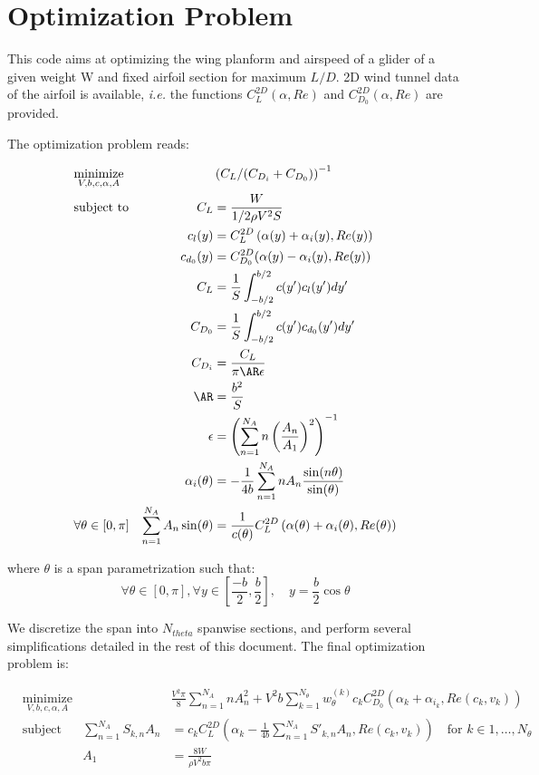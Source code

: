 \documentclass[letterpaper,12pt]{article}
\begin{document}
\section{Optimization Problem}

This code aims at optimizing the wing planform and airspeed of a glider of a given weight W and fixed airfoil section for maximum $L/D$.
2D wind tunnel data of the airfoil is available, {\it i.e.} the functions
$C_L^{2D}(\alpha, Re)$ and 
$C_{D_0}^{2D}(\alpha, Re)$ are provided.

The optimization problem reads:

\begin{align*}
	& \underset{V, b, c, \alpha, A}{\text{minimize}}
	& & \left( C_L / (C_{D_i} + C_{D_0})\right)^{-1} \nonumber \\
	& \text{subject to} 
	& C_L &= \frac{W}{1/2 \rho V^2 S} \\
	& & c_l(y) &= C_L^{2D} \left( \alpha(y) + \alpha_i(y), Re(y)\right) \\
	& & c_{d_0}(y) &= C_{D_0}^{2D}(\alpha(y) - \alpha_i(y), Re(y)) \\
	& & C_L &= \frac 1 S \int_{-b/2}^{b/2} c(y') c_l(y') dy'\\
	& & C_{D_0} &= \frac 1 S \int_{-b/2}^{b/2} c(y') c_{d_0}(y') dy'\\
	& & C_{D_i} & = \frac{C_L}{\pi \AR \epsilon} \\
	& & \AR &= \frac{b^2}{S} \\
	& & \epsilon &= \left(\sum_{n=1}^{N_A} n \left(\frac{A_n}{A_1}\right)^2 \right)^{-1} \\
	& & \alpha_i(\theta) &= -\frac 1 {4b} \sum_{n=1}^{N_A} n A_n\frac{\sin(n\theta)}{\sin(\theta)} \\
	& \forall \theta \in [0, \pi] & \sum_{n=1}^{N_A} A_n \sin(\theta) &= \frac{1}{c(\theta)} C_L^{2D} \left( \alpha(\theta) + \alpha_i(\theta), Re(\theta)\right) \\
\end{align*}

where $\theta$ is a span parametrization such that:
$$\forall \theta \in [0,\pi], \forall y \in [\frac {-b} 2, \frac b 2], \quad y = \frac b 2 \cos\theta$$

We discretize the span into $N_{theta}$ spanwise sections, and perform several simplifications detailed in the rest of this document.
The final optimization problem is:

\begin{align*}
	& \underset{V, b, c, \alpha, A}{\text{minimize}}
	& & \frac{V^2 \pi}{8}\sum_{n=1}^{N_A} n A_{n}^2 +
	  V^2 b  \sum_{k=1}^{N_{\theta}} w_{\theta}^{(k)} c_k C_{D_0}^{2D}\left( 
		\alpha_k +\alpha_{i_k}, Re(c_k, v_k)
		\right) \\
	& \text{subject to}
	&  \sum_{n=1}^{N_{A}} S_{k,n} A_n &=  c_kC_L^{2D} \left( \alpha_k - \frac {1}{4b} 
		\sum_{n=1}^{N_{A}}S'_{k,n}A_n , Re(c_k, v_k)\right) \quad \text{for } k \in 1,\dots, N_{\theta} \\
	& &  A_1 &= \frac{8W}{\rho V^2 b \pi}\\
\end{align*}
\end{document}
